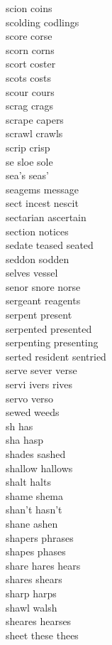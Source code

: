 scion coins\\
scolding codlings\\
score corse\\
scorn corns\\
scort coster \\
scots costs\\
scour cours\\
scrag crags\\
scrape capers\\
scrawl crawls\\
scrip crisp\\
se sloe sole  \\
sea's seas'\\
seagems message\\
sect incest nescit  \\
sectarian ascertain\\
section notices\\
sedate teased seated\\
seddon sodden\\
selves vessel\\
senor snore norse\\
sergeant reagents\\
serpent present\\
serpented presented\\
serpenting presenting\\
serted resident sentried  \\
serve sever verse\\
servi ivers rives\\
servo verso\\
sewed weeds\\
sh has \\
sha hasp \\
shades sashed\\
shallow hallows\\
shalt halts\\
shame shema\\
shan't hasn't\\
shane ashen\\
shapers phrases\\
shapes phases\\
share hares hears\\
shares shears\\
sharp harps\\
shawl walsh\\
sheares hearses\\
sheet these thees\\
